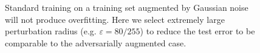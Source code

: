 \begin{figure}
\begin{minipage}{0.45\textwidth}
      \caption{
      Standard training on a training set augmented by Gaussian noise will not produce overfitting. Here we select extremely large perturbation radius (e.g. $\varepsilon = 80/255$) to reduce the test error to be comparable to the adversarially augmented case. 
      }
    \label{fig:double-descent-gaussian}
    \end{minipage}
\end{figure}





